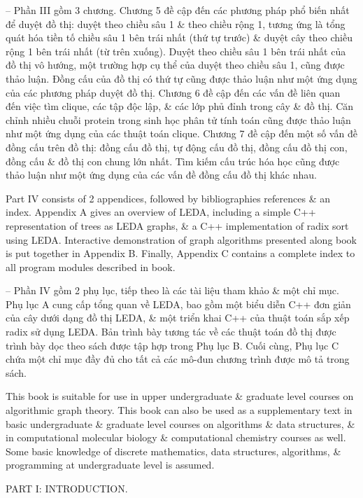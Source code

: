 \documentclass{article}
\begin{document}
\begin{itemize}
	-- Phần III gồm 3 chương. Chương 5 đề cập đến các phương pháp phổ biến nhất để duyệt đồ thị: duyệt theo chiều sâu 1 \& theo chiều rộng 1, tương ứng là tổng quát hóa tiền tố chiều sâu 1 bên trái nhất (thứ tự trước) \& duyệt cây theo chiều rộng 1 bên trái nhất (từ trên xuống). Duyệt theo chiều sâu 1 bên trái nhất của đồ thị vô hướng, một trường hợp cụ thể của duyệt theo chiều sâu 1, cũng được thảo luận. Đồng cấu của đồ thị có thứ tự cũng được thảo luận như một ứng dụng của các phương pháp duyệt đồ thị. Chương 6 đề cập đến các vấn đề liên quan đến việc tìm clique, các tập độc lập, \& các lớp phủ đỉnh trong cây \& đồ thị. Căn chỉnh nhiều chuỗi protein trong sinh học phân tử tính toán cũng được thảo luận như một ứng dụng của các thuật toán clique. Chương 7 đề cập đến một số vấn đề đồng cấu trên đồ thị: đồng cấu đồ thị, tự động cấu đồ thị, đồng cấu đồ thị con, đồng cấu \& đồ thị con chung lớn nhất. Tìm kiếm cấu trúc hóa học cũng được thảo luận như một ứng dụng của các vấn đề đồng cấu đồ thị khác nhau.
	
	Part IV consists of 2 appendices, followed by bibliographies references \& an index. Appendix A gives an overview of LEDA, including a simple C++ representation of trees as LEDA graphs, \& a C++ implementation of radix sort using LEDA. Interactive demonstration of graph algorithms presented along book is put together in Appendix B. Finally, Appendix C contains a complete index to all program modules described in book.
	
	-- Phần IV gồm 2 phụ lục, tiếp theo là các tài liệu tham khảo \& một chỉ mục. Phụ lục A cung cấp tổng quan về LEDA, bao gồm một biểu diễn C++ đơn giản của cây dưới dạng đồ thị LEDA, \& một triển khai C++ của thuật toán sắp xếp radix sử dụng LEDA. Bản trình bày tương tác về các thuật toán đồ thị được trình bày dọc theo sách được tập hợp trong Phụ lục B. Cuối cùng, Phụ lục C chứa một chỉ mục đầy đủ cho tất cả các mô-đun chương trình được mô tả trong sách.
	
	This book is suitable for use in upper undergraduate \& graduate level courses on algorithmic graph theory. This book can also be used as a supplementary text in basic undergraduate \& graduate level courses on algorithms \& data structures, \& in computational molecular biology \& computational chemistry courses as well. Some basic knowledge of discrete mathematics, data structures, algorithms, \& programming at undergraduate level is assumed.
	
	{\sf PART I: INTRODUCTION.}
	

\end{itemize}
\end{document}
